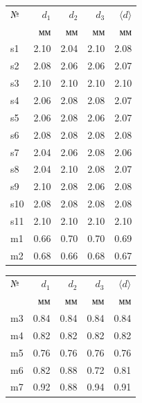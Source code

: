\documentclass[a4paper, 12pt]{article}
\begin{document}
    \begin{table}[h!]
        \vspace{5pt}
        \begin{center}
        \subtable
        {
            \begin{tabular}{|l|rrr|r|}
            \hline
            № &    $d_1$ &    $d_2$ &  $d_3$ & $\langle d \rangle$  \\
              &    мм   &      мм &       мм&         мм\\
            \hline
            s1   &  2.10 &  2.04 &  2.10 &    2.08 \\
            s2   &  2.08 &  2.06 &  2.06 &    2.07 \\
            s3   &  2.10 &  2.10 &  2.10 &    2.10 \\
            s4   &  2.06 &  2.08 &  2.08 &    2.07 \\
            s5   &  2.06 &  2.08 &  2.06 &    2.07 \\
            s6   &  2.08 &  2.08 &  2.08 &    2.08 \\
            s7   &  2.04 &  2.06 &  2.08 &    2.06 \\
            s8   &  2.04 &  2.10 &  2.08 &    2.07 \\
            s9   &  2.10 &  2.08 &  2.06 &    2.08 \\
            s10  &  2.08 &  2.08 &  2.08 &    2.08 \\
            s11  &  2.10 &  2.10 &  2.10 &    2.10 \\
            m1   &  0.66 &  0.70 &  0.70 &    0.69 \\
            m2   &  0.68 &  0.66 &  0.68 &    0.67 \\
            \hline
            \end{tabular}
        }
        \subtable
        {
            \begin{tabular}{|l|rrr|r|}
            \hline
            № &    $d_1$ &    $d_2$ &  $d_3$ & $\langle d \rangle$  \\
              &    мм   &      мм &       мм&         мм\\
            \hline
            m3   &  0.84 &  0.84 &  0.84 &    0.84 \\
            m4   &  0.82 &  0.82 &  0.82 &    0.82 \\
            m5   &  0.76 &  0.76 &  0.76 &    0.76 \\
            m6   &  0.82 &  0.88 &  0.72 &    0.81 \\
            m7   &  0.92 &  0.88 &  0.94 &    0.91 \\

\end{tabular}}
\end{center}
\end{table}
\end{document}

